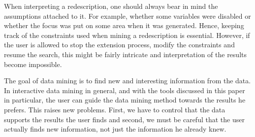 

When interpreting a redescription, one should always bear in mind
the assumptions attached to it. For example, whether some variables
were disabled or whether the focus was put on some area when it was
generated.  Hence, keeping track of the constraints used when mining a
redescription is essential. However, if the user is allowed to stop
the extension process, modify the constraints and resume the search,
this might be fairly intricate and interpretation of the results
become impossible.

The goal of data mining is to find new and interesting information
from the data. In interactive data mining in general, and with the
tools discussed in this paper in particular, the user can guide the
data mining method towards the results he prefers. This raises new
problems. First, we have to control that the data supports the results
the user finds and second, we must be careful that the user actually
finds new information, not just the information he already knew. 


